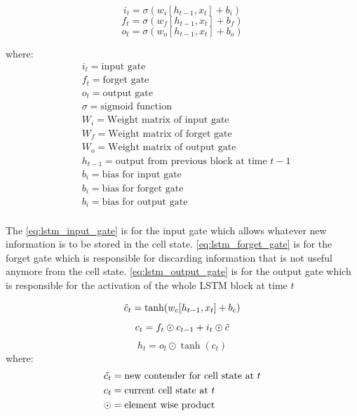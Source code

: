 \begin{equation} \label{eq:lstm_input_gate}
    i_{t} =\sigma(w_{i}[h_{t-1},x_{t}]+b_{i})
\end{equation}
\begin{equation}\label{eq:lstm_forget_gate}
    f_{t} =\sigma(w_{f}[h_{t-1},x_{t}]+b_{f})
\end{equation}
\begin{equation}\label{eq:lstm_output_gate}
    o_{t} = \sigma(w_{o}[h_{t-1},x_{t}]+b_{o})
\end{equation}

where:
\begin{align*}
      & i_{t}=\text{input gate}\\
      & f_{t}=\text{forget gate}\\
      & o_{t}=\text{output gate}\\
      & \sigma=\text{sigmoid function}\\
      & W_{i}=\text{Weight matrix of input gate}\\
      & W_{f}=\text{Weight matrix of forget gate}\\
      & W_{o}=\text{Weight matrix of output gate}\\
      & h_{t-1}=\text{output from previous block at time $t-1$}      \\
      & b_{i}=\text{bias for input gate}    \\
      & b_{i}=\text{bias for forget gate}    \\
      & b_{i}=\text{bias for output gate}\\
\end{align*}

The \ref{eq:lstm_input_gate} is for the input gate which allows whatever new information is to be stored in the cell state. \ref{eq:lstm_forget_gate} is for the forget gate which is responsible for discarding information that is not useful anymore from the cell state. \ref{eq:lstm_output_gate} is for the output gate which is responsible for the activation of the whole \gls{LSTM} block at time $t$ 


\begin{equation}\label{eq:lstm_newCellState}
    \Tilde{c}_{t} =\tanh(w_{c}[h_{t-1},x_{t}]+b_{c})
\end{equation}
\begin{equation} \label{eq:lstm_CurrentCellState}
    c_{t} = f_{t} \odot c_{t-1} + i_{t} \odot \Tilde{c}
\end{equation}
\begin{equation}\label{eq:lstm_output}
    h_{t} = o_{t} \odot \tanh(c_{t})
\end{equation}
where:
\begin{align*}
      & \Tilde{c_{t}}=\text{new contender for cell state at $t$}\\
      & c_{t}=\text{current cell state at $t$}\\
      & \odot=\text{element wise product}
\end{align*}


